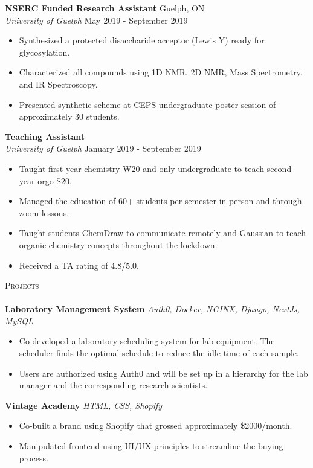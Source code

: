 \documentclass[a4paper]{article}
\newcommand{\lineunder} {
    \vspace*{-8pt} \\
    \hspace*{-18pt} \hrulefill \\
}
\newcommand{\header} [1] {
    {\hspace*{-18pt}\vspace*{6pt} \textsc{#1}}
    \vspace*{-6pt} \lineunder
}
\begin{document}
\textbf{NSERC Funded Research Assistant } \hfill Guelph, ON\\
\textit{University of Guelph} \hfill May 2019 - September 2019\\
\vspace{-1mm}
\begin{itemize} \itemsep 1pt
	\item Synthesized a protected disaccharide acceptor (Lewis Y) ready for glycosylation.
	\item Characterized all compounds using 1D NMR, 2D NMR, Mass Spectrometry, and IR Spectroscopy.
	\item Presented synthetic scheme at CEPS undergraduate poster session of approximately 30 students.
\end{itemize}

\textbf{Teaching Assistant} \\
\textit{University of Guelph} \hfill January 2019 - September 2019\\
\vspace{-1mm}
\begin{itemize} \itemsep 1pt
	\item Taught first-year chemistry W20 and only undergraduate to teach second-year orgo S20. 
	\item Managed the education of 60+ students per semester in person and through zoom lessons.
        \item Taught students ChemDraw to communicate remotely and Gaussian to teach organic chemistry concepts throughout the lockdown.
	\item Received a TA rating of 4.8/5.0.
\end{itemize}


\header{Projects}
{\textbf{Laboratory Management System}} {\sl Auth0, Docker, NGINX, Django, NextJs, MySQL} \\
\vspace{-1mm}
\begin{itemize} \itemsep 1pt
	\item Co-developed a laboratory scheduling system for lab equipment. The scheduler finds the optimal schedule to reduce the idle time of each sample.
	\item Users are authorized using Auth0 and will be set up in a hierarchy for the lab manager and the corresponding research scientists.\\
\end{itemize}
\vspace*{1mm}
{\textbf{Vintage Academy}} {\sl HTML, CSS, Shopify} \\
\vspace{-1mm}
\begin{itemize} \itemsep 1pt
	\item Co-built a brand using Shopify that grossed approximately      \$2000/month.
	\item Manipulated frontend using UI/UX principles to streamline the buying process.\\
\end{itemize}
\vspace*{1mm}
\end{document}
